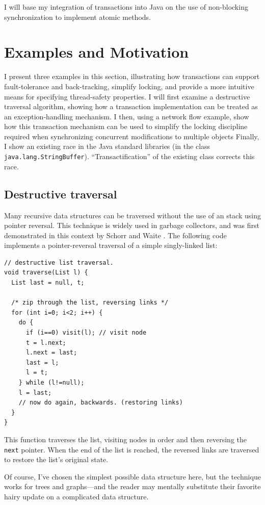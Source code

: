 \documentclass[12pt,twoside]{article}
\newcommand{\sis}{\linespread{1.0}\setlength{\baselineskip}{0.8\baselineskip}}
\newcommand{\subsecput}[2]{\subsection{#2}\label{sec:#1}}
\begin{document}
I will base my integration of transactions into Java on the use of
non-blocking synchronization to implement atomic methods.

\section{Examples and Motivation}
I present three examples in this section, illustrating how
transactions can support fault-tolerance and back-tracking,
simplify locking, and provide a more intuitive
means for specifying thread-safety properties.
I will first examine a destructive traversal algorithm, showing how a
transaction implementation can be treated as an exception-handling
mechanism.   I then, using a network flow example, show how this
transaction mechanism can be used to simplify
the locking discipline required when synchronizing concurrent
modifications to multiple objects
Finally, I show an existing race in the Java standard libraries (in 
the class \texttt{java.lang.StringBuffer}).  ``Transactification'' of
the existing class corrects this race.

\subsecput{destruct}{Destructive traversal}
Many recursive data structures can be traversed without the use of an
stack using pointer reversal.  This technique is widely used in
garbage collectors, and was first demonstrated in this context by
Schorr and Waite \cite{SchorrWa67}.  The following code implements a
pointer-reversal traversal of a simple singly-linked list:
 \par {\footnotesize\samepage\sis
\begin{verbatim}
// destructive list traversal.
void traverse(List l) {
  List last = null, t;
  
  /* zip through the list, reversing links */
  for (int i=0; i<2; i++) {
    do {
      if (i==0) visit(l); // visit node
      t = l.next;
      l.next = last;
      last = l;
      l = t;
    } while (l!=null);
    l = last;
    // now do again, backwards. (restoring links)
  }
}
\end{verbatim}
}
This function traverses the list, visiting nodes in order and then
reversing the {\tt next} pointer.  When the end of the list is
reached, the reversed links are traversed to restore the list's original
state.  

Of course, I've chosen the simplest possible data structure here, but
the technique works for trees and graphs---and the reader may mentally
substitute their favorite hairy update on a complicated data
structure.
\end{document}
